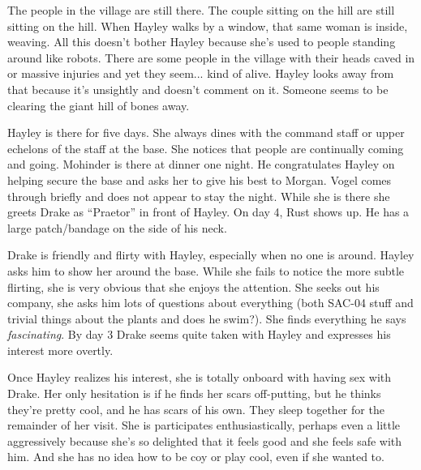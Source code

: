 The people in the village are still there.  The couple sitting on the hill are still sitting on the hill.  When Hayley walks by a window, that same woman is inside, weaving.  All this doesn't bother Hayley because she's used to people standing around like robots.  There are some people in the village with their heads caved in or massive injuries and yet they seem... kind of alive.  Hayley looks away from that because it's unsightly and doesn't comment on it.  Someone seems to be clearing the giant hill of bones away.



Hayley is there for five days.  She always dines with the command staff or upper echelons of the staff at the base.  She notices that people are continually coming and going. Mohinder is there at dinner one night.  He congratulates Hayley on helping secure the base and asks her to give his best to Morgan.  Vogel comes through briefly and does not appear to stay the night.  While she is there she greets Drake as ``Praetor'' in front of Hayley.  On day 4, Rust shows up.  He has a large patch/bandage on the side of his neck.



Drake is friendly and flirty with Hayley, especially when no one is around.  Hayley asks him to show her around the base.  While she fails to notice the more subtle flirting, she is very obvious that she enjoys the attention.  She seeks out his company, she asks him lots of questions about everything (both SAC-04 stuff and trivial things about the plants and does he swim?).  She finds everything he says \textit{fascinating}.  By day 3 Drake seems quite taken with Hayley and expresses his interest more overtly.



Once Hayley realizes his interest, she is totally onboard with having sex with Drake.  Her only hesitation is if he finds her scars off-putting, but he thinks they're pretty cool, and he has scars of his own.  They sleep together for the remainder of her visit.  She is participates enthusiastically, perhaps even a little aggressively because she's so delighted that it feels good and she feels safe with him.  And she has no idea how to be coy or play cool, even if she wanted to.



